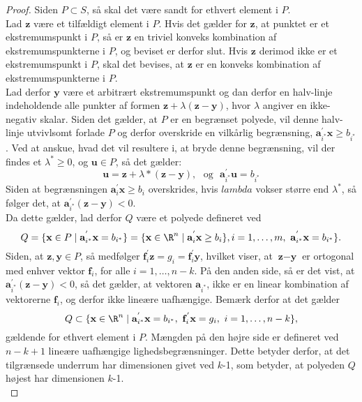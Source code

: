 \begin{proof}
Siden $P \subset S$, så skal det være sandt for ethvert element i $P$. \\
Lad $\textbf{z}$ være et tilfældigt element i $P$. Hvis det gælder for $\textbf{z}$, at punktet er et ekstremumspunkt i $P$, så er $\textbf{z}$ en triviel konveks kombination af ekstremumspunkterne i $P$, og beviset er derfor slut. Hvis $\textbf{z}$ derimod ikke er et ekstremumspunkt i $P$, skal det bevises, at $\textbf{z}$ er en konveks kombination af ekstremumspunkterne i $P$. \\
Lad derfor $\textbf{y}$ være et arbitrært ekstremumspunkt og dan derfor en halv-linje indeholdende alle punkter af formen $\textbf{z}+\lambda(\textbf{z}-\textbf{y})$, hvor $\lambda$ angiver en ikke-negativ skalar. Siden det gælder, at $P$ er en begrænset polyede, vil denne halv-linje utvivlsomt forlade $P$ og derfor overskride en vilkårlig begrænsning, $\mathbf{a}_{i^*}^{'} \textbf{x} \geq b_{i^*}$. Ved at anskue, hvad det vil resultere i, at bryde denne begrænsning, vil der findes et $\lambda^* \geq 0$, og $\textbf{u} \in P$, så det gælder: \\ 
$$\textbf{u}=\textbf{z}+\lambda*(\textbf{z}-\textbf{y}), \text{     } \text{og} \text{      } \mathbf{a}_{i^*}^{'} \textbf{u} = b_{i^*} $$
Siden at begrænsningen $\mathbf{a}_{i}^{'} \textbf{x} \geq b_i$ overskrides, hvis $lambda$ vokser større end $\lambda^*$, så følger det, at $\mathbf{a}_{i^*}^{'}(\textbf{z}-\textbf{y}) <0.$ \\
Da dette gælder, lad derfor $Q$ være et polyede defineret ved 
$$Q=\{\textbf{x} \in P \mid \mathbf{a}_{i^*}^{'} \textbf{x} =b_{i^*}\} = \{\textbf{x} \in \R^n \mid \mathbf{a}_{i}^{'} \textbf{x} \geq b_{i}\}, i=1,\ldots,m, \text{   } \mathbf{a}_{i^*}^{'} \textbf{x} =b_{i^*}\}.$$
Siden, at $\textbf{z},\textbf{y} \in P$, så medfølger $\mathbf{f}_{i}^{'}\textbf{z}=g_i=\mathbf{f}_{i}^{'}\textbf{y}$, hvilket viser, at $\textbf{z}-\textbf{y}$ er ortogonal med enhver vektor $\mathbf{f}_{i}$, for alle $i=1,\ldots,n-k$. På den anden side, så er det vist, at $\mathbf{a}_{i^*}^{'}(\textbf{z}-\textbf{y}) <0$, så det gælder, at vektoren  $\mathbf{a}_{i^*}$, ikke er en linear kombination af vektorerne $\mathbf{f}_{i}$, og derfor ikke lineære uafhængige. Bemærk derfor at det gælder \\
$$Q \subset \{\textbf{x} \in \R^n \mid \mathbf{a}_{i^*}^{'} \textbf{x}=b_{i^*}, \text{  } \mathbf{f}_{i}^{'}\textbf{x}=g_i, \text{  } i=1,\ldots,n-k\},$$ 
gældende for ethvert element i $P$. Mængden på den højre side er defineret ved $n-k+1$ lineære uafhængige lighedsbegrænsninger. Dette betyder derfor, at det tilgrænsede underrum har dimensionen givet ved $k$-1, som betyder, at polyeden $Q$ højest har dimensionen $k$-1. \\

\end{proof}
